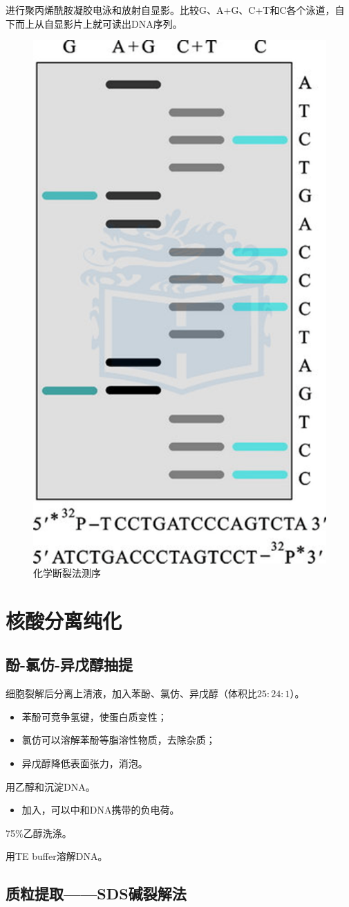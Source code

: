 进行聚丙烯酰胺凝胶电泳和放射自显影。比较G、A+G、C+T和C各个泳道，自下而上从自显影片上就可读出DNA序列。

\begin{figure}[htbp]
	\centering
	\includegraphics[width=0.3\linewidth]{Pics/化学断裂法测序}
	\caption{化学断裂法测序}
	\label{fig:MG_sequencing}
\end{figure}


\section{核酸分离纯化}

\subsection{酚-氯仿-异戊醇抽提}

细胞裂解后分离上清液，加入苯酚、氯仿、异戊醇（体积比$25:24:1$）。
\begin{itemize}
	\item 苯酚可竞争氢键，使蛋白质变性；
	\item 氯仿可以溶解苯酚等脂溶性物质，去除杂质；
	\item 异戊醇降低表面张力，消泡。
\end{itemize}

用乙醇和沉淀DNA。
\begin{itemize}
	\item 加入，可以中和DNA携带的负电荷。
\end{itemize}

75\%乙醇洗涤。

用TE buffer溶解DNA。

\subsection{质粒提取——SDS碱裂解法}

